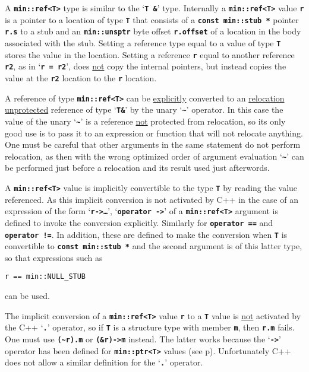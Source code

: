 \documentclass[12pt]{article}
\newcommand{\TT}[1]{{\tt \bfseries #1}}
\newcommand{\pagref}[1]{p\pageref{#1}}
\newcommand{\EOL}{\penalty \exhyphenpenalty}
\begin{document}
A \TT{min::ref<T>} type is similar to the `\TT{T \&}' type.
Internally a \TT{min::ref<T>} value \TT{r}
is a pointer to a location of type \TT{T} that
consists of a \TT{const min::\EOL stub~*} pointer \TT{r.s} to a stub
and an \TT{min::\EOL unsptr} byte offset \TT{r.offset}
of a location in the body
associated with the stub.  Setting a reference type equal to a value
of type \TT{T} stores the value in the location.  Setting a reference
\TT{r} equal to another reference \TT{r2}, as in `\TT{r~=~r2}', does
\underline{not} copy the internal pointers, but instead copies the
value at the \TT{r2} location to the \TT{r} location.

A reference of type \TT{min::ref<T>} can be \underline{explicitly} converted
to an \underline{relocation unprotected}
reference of type `\TT{T\&}' by the unary `\TT{\textasciitilde}' operator.
In this case the value of the unary `\TT{\textasciitilde}'
is a reference \underline{not}
protected from relocation, so its only good use is to pass it to an
expression or function that will not relocate anything.
One must be careful that other arguments in the same statement
do not perform relocation, as then with the wrong optimized
order of argument evaluation `\TT{\textasciitilde}'
can be performed just before a
relocation and its result used just afterwords.

A \TT{min::ref<T>} value is implicitly convertible to the type \TT{T}
by reading the value referenced.
As this implicit conversion
is not activated by C++ in the case of an expression of the form
`\TT{r->\ldots}'\label{REF->},
`\TT{operator~->}' of a \TT{min::\EOL ref<T>}
argument is defined to invoke the conversion explicitly.
Similarly for \TT{operator ==} and \TT{operator !=}.
In addition, these are defined to make the conversion when
\TT{T} is convertible to \TT{const min::\EOL stub~*} and the
second argument is of this latter type, so that expressions such as
\begin{center}
\tt r == min::NULL\_STUB
\end{center}
can be used.

The implicit conversion of a \TT{min::\EOL ref<T>} value \TT{r} to a \TT{T}
value is \underline{not} activated by the C++ `\TT{.}' operator,
so if \TT{T} is a structure type with member \TT{m}, then \TT{r.m}
fails.  One must use \TT{(\textasciitilde r).m}
or \TT{(\&r)->m} instead.  The latter works because
the `\TT{->}' operator has been defined for \TT{min::\EOL ptr<T>}
values (see \pagref{PTR->}).
Unfortunately C++ does not allow a similar definition for the
`\TT{.}' operator.
\end{document}
